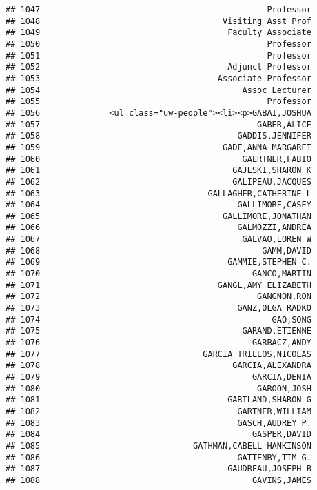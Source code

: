 \documentclass[
]{article}
\begin{document}
\begin{verbatim}
## 1047                                              Professor
## 1048                                     Visiting Asst Prof
## 1049                                      Faculty Associate
## 1050                                              Professor
## 1051                                              Professor
## 1052                                      Adjunct Professor
## 1053                                    Associate Professor
## 1054                                         Assoc Lecturer
## 1055                                              Professor
## 1056              <ul class="uw-people"><li><p>GABAI,JOSHUA
## 1057                                            GABER,ALICE
## 1058                                        GADDIS,JENNIFER
## 1059                                     GADE,ANNA MARGARET
## 1060                                         GAERTNER,FABIO
## 1061                                       GAJESKI,SHARON K
## 1062                                       GALIPEAU,JACQUES
## 1063                                  GALLAGHER,CATHERINE L
## 1064                                        GALLIMORE,CASEY
## 1065                                     GALLIMORE,JONATHAN
## 1066                                        GALMOZZI,ANDREA
## 1067                                         GALVAO,LOREN W
## 1068                                             GAMM,DAVID
## 1069                                      GAMMIE,STEPHEN C.
## 1070                                           GANCO,MARTIN
## 1071                                    GANGL,AMY ELIZABETH
## 1072                                            GANGNON,RON
## 1073                                        GANZ,OLGA RADKO
## 1074                                               GAO,SONG
## 1075                                         GARAND,ETIENNE
## 1076                                           GARBACZ,ANDY
## 1077                                 GARCIA TRILLOS,NICOLAS
## 1078                                       GARCIA,ALEXANDRA
## 1079                                           GARCIA,DENIA
## 1080                                            GAROON,JOSH
## 1081                                      GARTLAND,SHARON G
## 1082                                        GARTNER,WILLIAM
## 1083                                        GASCH,AUDREY P.
## 1084                                           GASPER,DAVID
## 1085                               GATHMAN,CABELL HANKINSON
## 1086                                        GATTENBY,TIM G.
## 1087                                      GAUDREAU,JOSEPH B
## 1088                                           GAVINS,JAMES

\end{verbatim}
\end{document}
